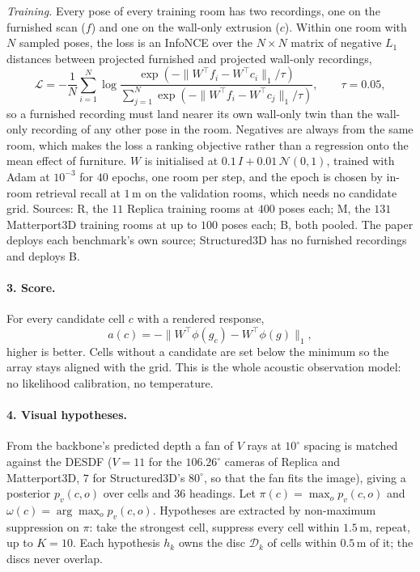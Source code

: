 \emph{Training.} Every pose of every training room has two recordings, one on
the furnished scan ($f$) and one on the wall-only extrusion ($c$). Within one
room with $N$ sampled poses, the loss is an InfoNCE over the $N \times N$
matrix of negative $L_1$ distances between projected furnished and projected
wall-only recordings,
\begin{equation}
  \mathcal{L} = -\frac{1}{N}\sum_{i=1}^{N}
  \log \frac{\exp(-\|W^{\!\top}\! f_i - W^{\!\top}\! c_i\|_1 / \tau)}
            {\sum_{j=1}^{N} \exp(-\|W^{\!\top}\! f_i - W^{\!\top}\! c_j\|_1 / \tau)},
  \qquad \tau = 0.05,
\end{equation}
so a furnished recording must land nearer its own wall-only twin than the
wall-only recording of any other pose in the room. Negatives are always from
the same room, which makes the loss a ranking objective rather than a
regression onto the mean effect of furniture. $W$ is initialised at
$0.1\,I + 0.01\,\mathcal{N}(0,1)$, trained with Adam at $10^{-3}$ for $40$
epochs, one room per step, and the epoch is chosen by in-room retrieval recall
at $1$\,m on the validation rooms, which needs no candidate grid. Sources: R,
the $11$ Replica training rooms at $400$ poses each; M, the $131$ Matterport3D
training rooms at up to $100$ poses each; B, both pooled. The paper deploys
each benchmark's own source; Structured3D has no furnished recordings and
deploys B.

\paragraph{3. Score.}
For every candidate cell $c$ with a rendered response,
\begin{equation}
  a(c) = -\big\| W^{\!\top}\phi(g_c) - W^{\!\top}\phi(g) \big\|_1 ,
  \label{eq:ab-score}
\end{equation}
higher is better. Cells without a candidate are set below the minimum so the
array stays aligned with the grid. This is the whole acoustic observation
model: no likelihood calibration, no temperature.

\paragraph{4. Visual hypotheses.}
From the backbone's predicted depth a fan of $V$ rays at $10^\circ$ spacing is
matched against the DESDF ($V = 11$ for the $106.26^\circ$ cameras of Replica
and Matterport3D, $7$ for Structured3D's $80^\circ$, so that the fan fits the
image), giving a posterior $p_v(c, o)$ over cells and $36$ headings. Let
$\pi(c) = \max_o p_v(c,o)$ and $\omega(c) = \arg\max_o p_v(c,o)$. Hypotheses
are extracted by non-maximum suppression on $\pi$: take the strongest cell, suppress
every cell within $1.5$\,m, repeat, up to $K = 10$. Each hypothesis $h_k$ owns
the disc $\mathcal{D}_k$ of cells within $0.5$\,m of it; the discs never overlap.

